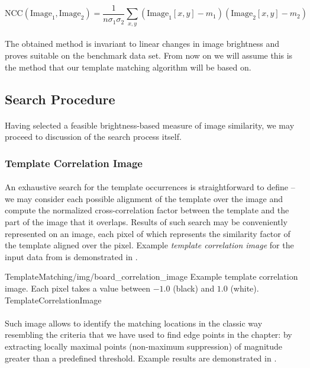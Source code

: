 \[
\mbox{NCC}(\mbox{Image}_1,\mbox{Image}_2) = \frac{1}{n\sigma_1 \sigma_2} \sum_{x,y} (\mbox{Image}_1[x,y]-m_1)(\mbox{Image}_2[x,y]-m_2)
\]

\paragraph*{}
The obtained method is invariant to linear changes in image brightness and proves suitable on the benchmark data set. From now on we will assume this is the method that our template matching algorithm will be based on.

\subsection{Search Procedure}

\paragraph*{}
Having selected a feasible brightness-based measure of image similarity, we may proceed to discussion of the search process itself.

\subsubsection{Template Correlation Image}

\paragraph*{}
An exhaustive search for the template occurrences is straightforward to define -- we may consider each possible alignment of the template over the image and compute the normalized cross-correlation factor between the template and the part of the image that it overlaps. Results of such search may be conveniently represented on an image, each pixel of which represents the similarity factor of the template aligned over the pixel. Example \textit{template correlation image} for the input data from  is demonstrated in .


\oneFigure
{TemplateMatching/img/board_correlation_image}
{Example template correlation image. Each pixel takes a value between $-1.0$ (black) and $1.0$ (white).}
{TemplateCorrelationImage}
{\basicWidth}

\paragraph*{}
Such image allows to identify the matching locations in the classic way resembling the criteria that we have used to find edge points in the  chapter: by extracting locally maximal points (non-maximum suppression) of magnitude greater than a predefined threshold. Example results are demonstrated in .

